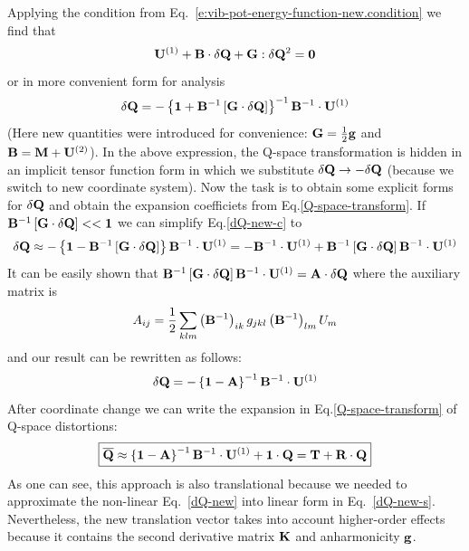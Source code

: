 \documentclass[a4paper,titlepage,twoside,fleqn,12pt]{book}
\begin{document}
\begin{refsection}
Applying the condition from Eq.~\eqref{e:vib-pot-energy-function-new.condition} we find that
%
\begin{equation}\label{dQ-new}
{\bf U}^{(1)} + {\bf B} \cdot \delta {\bf Q} + {\bf G} : \delta{\bf Q}^2 = {\bf 0}
\end{equation}
%
or in more convenient form for analysis
%
\begin{equation}\label{dQ-new-c}
\delta {\bf Q} = 
-\left\{ 
       {\bf 1} + {\bf B}^{-1} \left[ {\bf G} \cdot \delta {\bf Q} \right]
\right\}^{-1} {\bf B}^{-1} \cdot {\bf U}^{(1)}
\end{equation}
%
(Here new quantities were introduced for convenience: ${\bf G} = \frac{1}{2} {\bf g}$
and ${\bf B} = {\bf M} + {\bf U}^{(2)}$). 
In the above expression, the Q-space transformation is hidden in an implicit tensor
function form in which we substitute $\delta {\bf Q}\rightarrow -\delta {\bf Q}$
(because we switch to new coordinate system).
Now the task is to obtain some explicit forms for $\delta {\bf Q}$ and
obtain the expansion coefficiets from Eq.\eqref{Q-space-transform}.
%
If~${\bf B}^{-1} \left[ {\bf G} \cdot \delta {\bf Q} \right] << {\bf 1} $ 
we can simplify Eq.\eqref{dQ-new-c} to
%
\begin{equation}\label{dQ-new-s}
\delta {\bf Q} \approx
-\left\{ 
       {\bf 1} - {\bf B}^{-1} \left[ {\bf G} \cdot \delta {\bf Q} \right]
\right\} {\bf B}^{-1} \cdot {\bf U}^{(1)} = 
%
- {\bf B}^{-1} \cdot {\bf U}^{(1)} + {\bf B}^{-1} \left[ {\bf G} \cdot \delta {\bf Q} \right] {\bf B}^{-1} \cdot {\bf U}^{(1)}
\end{equation}
%
It can be easily shown that 
${\bf B}^{-1} \left[ {\bf G} \cdot \delta {\bf Q} \right] {\bf B}^{-1} \cdot {\bf U}^{(1)} = {\bf A} \cdot \delta {\bf Q}$
where the auxiliary matrix is
%
\begin{equation}\label{A}
A_{ij} = \frac{1}{2}\sum_{klm} 
   \left( {\bf B}^{-1} \right)_{ik} g_{jkl} \left( {\bf B}^{-1} \right)_{lm} 
U_m
\end{equation}
%
and our result can be rewritten as follows:
%
\begin{equation}\label{dQ-T1}
\delta {\bf Q} = -  \left\{ {\bf 1} - {\bf A} \right\}^{-1} {\bf B}^{-1} \cdot {\bf U}^{(1)}
\end{equation}
%
After coordinate change we can write the expansion in Eq.\eqref{Q-space-transform} 
of Q-space distortions:
\begin{equation}\label{Q-new-T1}
\boxed{
{\bf \overline{Q}} \approx  \left\{ {\bf 1} - {\bf A} \right\}^{-1} {\bf B}^{-1} \cdot {\bf U}^{(1)} + {\bf 1} \cdot {\bf Q}
= {\bf T} + {\bf R} \cdot {\bf Q}
}
\end{equation}
%
As one can see, this approach is also translational because 
we needed to approximate the non-linear Eq.~\eqref{dQ-new} into
linear form in Eq.~\eqref{dQ-new-s}.
Nevertheless, the new translation vector takes into account
higher-order effects because it contains the second derivative matrix $\bf K$
and anharmonicity $\bf g$.


\end{refsection}
\end{document}
